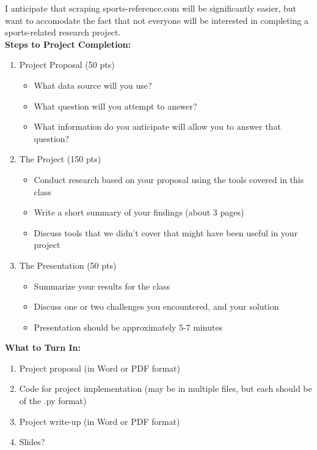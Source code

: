 \documentclass[12pt, margin=.5in]{article}
\begin{document}
\begin{large}
I anticipate that scraping sports-reference.com will be significantly easier, but want to accomodate the fact that not everyone will be interested in completing a sports-related research project.
\\[2 em]
\textbf{Steps to Project Completion:}
\begin{enumerate}
\item Project Proposal (50 pts)
\begin{itemize}
\item What data source will you use?
\item What question will you attempt to answer?
\item What information do you anticipate will allow you to answer that question?
\end{itemize}
\item The Project (150 pts)
\begin{itemize}
\item Conduct research based on your proposal using the tools covered in this class
\item Write a short summary of your findings (about 3 pages)
\item Discuss tools that we didn't cover that might have been useful in your project
\end{itemize}
\item The Presentation (50 pts)
\begin{itemize}
\item Summarize your results for the class
\item Discuss one or two challenges you encountered, and your solution
\item Presentation should be approximately 5-7 minutes
\end{itemize}
\end{enumerate}

\textbf{What to Turn In:}
\begin{enumerate}
\item Project proposal (in Word or PDF format)
\item Code for project implementation (may be in multiple files, but each should be of the .py format)
\item Project write-up (in Word or PDF format)
\item Slides?
\end{enumerate}

\end{large}
\end{document}
